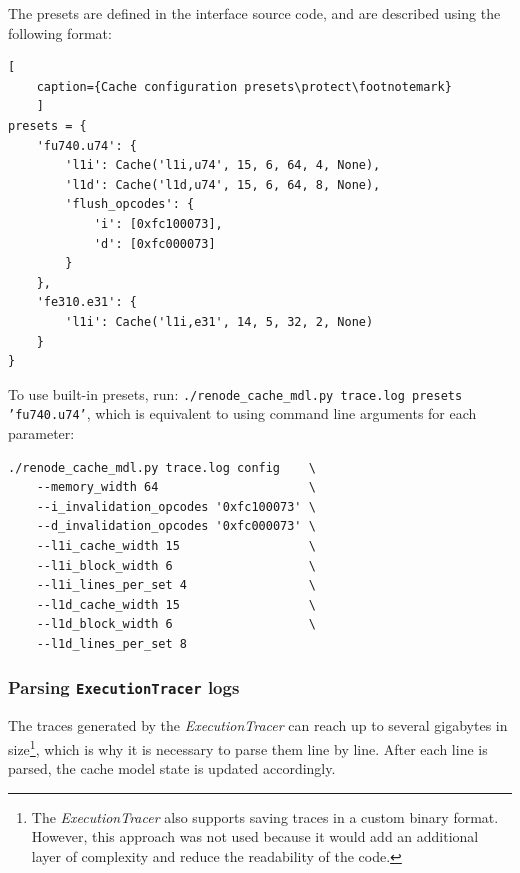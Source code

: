 \noindent The presets are defined in the interface source code, and are described using the following format:
\begin{center}
\centering
\begin{minipage}{\linewidth}
\begin{lstlisting}[
    caption={Cache configuration presets\protect\footnotemark}
    ]
presets = {
    'fu740.u74': {
        'l1i': Cache('l1i,u74', 15, 6, 64, 4, None),
        'l1d': Cache('l1d,u74', 15, 6, 64, 8, None),
        'flush_opcodes': {
            'i': [0xfc100073],
            'd': [0xfc000073]
        }
    },
    'fe310.e31': {
        'l1i': Cache('l1i,e31', 14, 5, 32, 2, None)
    }
}
\end{lstlisting}
\end{minipage}
\end{center}

\noindent To use built-in presets, run: \texttt{./renode\_cache\_mdl.py trace.log presets 'fu740.u74'}, which is equivalent to using command line arguments for each parameter:

\begin{verbatim}
./renode_cache_mdl.py trace.log config    \
    --memory_width 64                     \
    --i_invalidation_opcodes '0xfc100073' \
    --d_invalidation_opcodes '0xfc000073' \
    --l1i_cache_width 15                  \
    --l1i_block_width 6                   \
    --l1i_lines_per_set 4                 \
    --l1d_cache_width 15                  \
    --l1d_block_width 6                   \
    --l1d_lines_per_set 8
\end{verbatim}

\subsubsection*{Parsing \texttt{ExecutionTracer} logs}

The traces generated by the \textit{ExecutionTracer} can reach up to several gigabytes in size\footnote{The \textit{ExecutionTracer} also supports saving traces in a custom binary format. However,
this approach was not used because it would add an additional layer of complexity and reduce the readability of the code.}, which is why it is necessary to parse them line by line. 
After each line is parsed, the cache model state is updated accordingly.

